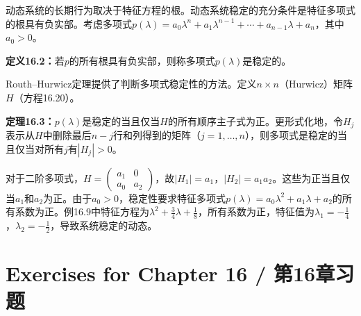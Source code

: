 \begin{translation}
动态系统的长期行为取决于特征方程的根。动态系统稳定的充分条件是特征多项式的根具有负实部。考虑多项式$p(\lambda) = a_0\lambda^n + a_1\lambda^{n-1} + \cdots + a_{n-1}\lambda + a_n$，其中$a_0 > 0$。

\textbf{定义16.2：}若$p$的所有根具有负实部，则称多项式$p(\lambda)$是稳定的。

Routh--Hurwicz定理提供了判断多项式稳定性的方法。定义$n \times n$（Hurwicz）矩阵$H$（方程16.20）。

\textbf{定理16.3：}$p(\lambda)$是稳定的当且仅当$H$的所有顺序主子式为正。更形式化地，令$H_j$表示从$H$中删除最后$n - j$行和列得到的矩阵（$j = 1, \ldots, n$），则多项式是稳定的当且仅当对所有$j$有$|H_j| > 0$。

对于二阶多项式，$H = \begin{pmatrix} a_1 & 0 \\ a_0 & a_2 \end{pmatrix}$，故$|H_1| = a_1$，$|H_2| = a_1 a_2$。这些为正当且仅当$a_1$和$a_2$为正。由于$a_0 > 0$，稳定性要求特征多项式$p(\lambda) = a_0\lambda^2 + a_1\lambda + a_2$的所有系数为正。例16.9中特征方程为$\lambda^2 + \frac{3}{4}\lambda + \frac{1}{8}$，所有系数为正，特征值为$\lambda_1 = -\frac{1}{4}$，$\lambda_2 = -\frac{1}{2}$，导致系统稳定的动态。
\end{translation}

\section*{Exercises for Chapter 16 / 第16章习题}

